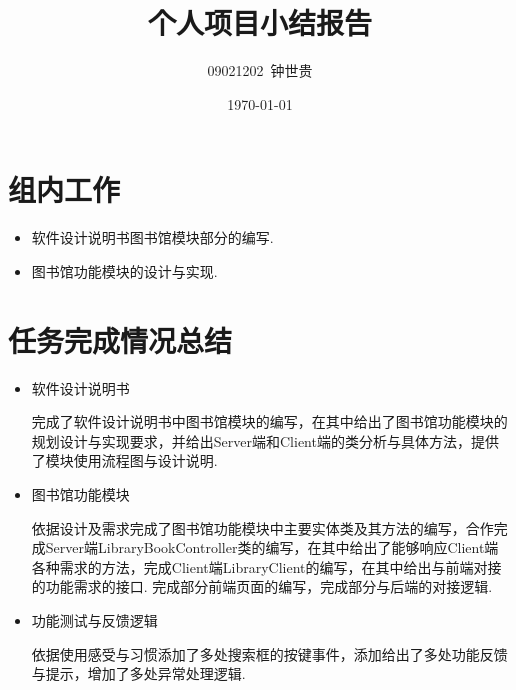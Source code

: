 \documentclass{article}
\title{个人项目小结报告}
\author{09021202~钟世贵}
\date{\today}
\begin{document}
\maketitle

\section{组内工作}
\begin{itemize}
    \item 软件设计说明书图书馆模块部分的编写.

    \item 图书馆功能模块的设计与实现.
\end{itemize}


\section{任务完成情况总结}
\begin{itemize}
    \item 软件设计说明书

          完成了软件设计说明书中图书馆模块的编写，在其中给出了图书馆功能模块的规划设计与实现要求，并给出Server端和Client端的类分析与具体方法，提供了模块使用流程图与设计说明.

    \item 图书馆功能模块

          依据设计及需求完成了图书馆功能模块中主要实体类及其方法的编写，合作完成Server端LibraryBookController类的编写，在其中给出了能够响应Client端各种需求的方法，完成Client端LibraryClient的编写，在其中给出与前端对接的功能需求的接口. 完成部分前端页面的编写，完成部分与后端的对接逻辑.

    \item 功能测试与反馈逻辑

          依据使用感受与习惯添加了多处搜索框的按键事件，添加给出了多处功能反馈与提示，增加了多处异常处理逻辑.


\end{itemize}
\end{document}

